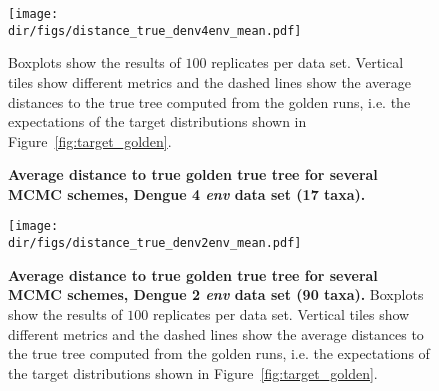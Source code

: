 \begin{figure}[!ht]
\begin{center}
\texttt{[image: \\dir/figs/distance\_true\_denv4env\_mean.pdf]} 
\end{center}
 \caption[Average distance to true golden true tree for several MCMC schemes, Dengue 4 \textit{env} data set (17 taxa).]{\textbf{Average distance to true golden true tree for several MCMC schemes, Dengue 4 \textit{env} data set (17 taxa).}
  }
  Boxplots show the results of $100$ replicates per data set.
  Vertical tiles show different metrics and the dashed lines show the average distances to the true tree computed from the golden runs, i.e. the expectations of the target distributions shown in Figure~\ref{fig:target_golden}.
 \label{fig:distance_true_denv4_mean}
\end{figure}

\begin{figure}[!ht]
\begin{center}
\texttt{[image: \\dir/figs/distance\_true\_denv2env\_mean.pdf]} 
\end{center}
 \caption[Average distance to true golden true tree for several MCMC schemes, Dengue 2 \textit{env} data set (90 taxa).]{\textbf{Average distance to true golden true tree for several MCMC schemes, Dengue 2 \textit{env} data set (90 taxa).}
  Boxplots show the results of $100$ replicates per data set.
  Vertical tiles show different metrics and the dashed lines show the average distances to the true tree computed from the golden runs, i.e. the expectations of the target distributions shown in Figure~\ref{fig:target_golden}.
  }
 \label{fig:distance_true_denv2_mean}
\end{figure}

